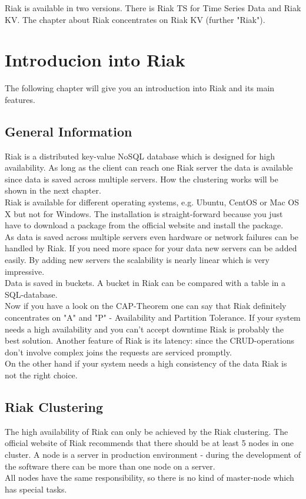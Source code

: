 Riak is available in two versions. There is Riak TS for Time Series Data and Riak KV. The chapter about Riak concentrates on Riak KV (further "Riak").
\section{Introducion into Riak}
The following chapter will give you an introduction into Riak and its main features. 
\subsection{General Information}
Riak is a distributed key-value NoSQL database which is designed for high availability. As long as the client can reach one Riak server the data is available since data is saved across multiple servers. How the clustering works will be shown in the next chapter. 
\\
Riak is available for different operating systems, e.g. Ubuntu, CentOS or Mac OS X but not for Windows. The installation is straight-forward because you just have to download a package from the official website and install the package. 
\\ 
As data is saved across multiple servers even hardware or network failures can be handled by Riak. If you need more space for your data new servers can be added easily. By adding new servers the scalability is nearly linear which is very impressive. 
\\
Data is saved in buckets. A bucket in Riak can be compared with a table in a SQL-database. 
\\ 
Now if you have a look on the CAP-Theorem one can say that Riak definitely concentrates on "A" and "P" - Availability and Partition Tolerance. If your system needs a high availability and you can't accept downtime Riak is probably the best solution. Another feature of Riak is its latency: since the CRUD-operations don't involve complex joins the requests are serviced promptly.
\\
On the other hand if your system needs a high consistency of the data Riak is not the right choice. 
\subsection{Riak Clustering}
The high availability of Riak can only be achieved by the Riak clustering. The official website of Riak recommends that there should be at least 5 nodes in one cluster. A node is a server in production environment - during the development of the software there can be more than one node on a server. 
\\
All nodes have the same responsibility, so there is no kind of master-node which has special tasks. 

